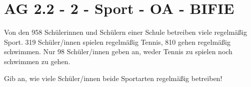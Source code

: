\section{AG 2.2 - 2 - Sport  - OA - BIFIE}

\begin{beispiel}[AG 2.2]{1} %
Von den 958 Schülerinnen und Schülern einer Schule betreiben viele regelmäßig Sport.
319 Schüler/innen spielen regelmäßig Tennis, 810 gehen regelmäßig schwimmen. Nur 98 Schüler/innen geben an, weder Tennis zu spielen noch schwimmen zu gehen.

\leer

Gib an, wie viele Schüler/innen beide Sportarten regelmäßig betreiben!	

\end{beispiel}